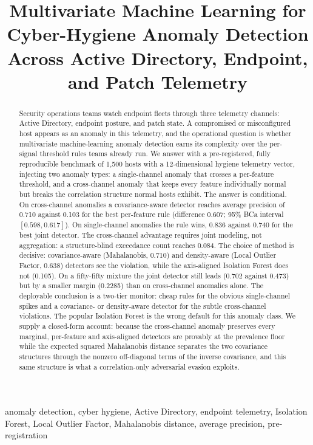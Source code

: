 \documentclass[journal]{IEEEtran}
\title{Multivariate Machine Learning for Cyber-Hygiene Anomaly Detection\\
Across Active Directory, Endpoint, and Patch Telemetry}
\author{%
  \IEEEauthorblockN{Harshavardhan Malla}
  \IEEEauthorblockA{Independent Researcher\\
  Email: harshavardhanmalla75@gmail.com}%
}
\begin{document}
\maketitle

\begin{abstract}
Security operations teams watch endpoint fleets through three telemetry channels: Active
Directory, endpoint posture, and patch state. A compromised or misconfigured host appears as an
anomaly in this telemetry, and the operational question is whether multivariate machine-learning
anomaly detection earns its complexity over the per-signal threshold rules teams already run. We
answer with a pre-registered, fully reproducible benchmark of 1{,}500 hosts with a
12-dimensional hygiene telemetry vector, injecting two anomaly types: a single-channel anomaly
that crosses a per-feature threshold, and a cross-channel anomaly that keeps every feature
individually normal but breaks the correlation structure normal hosts exhibit. The answer is
conditional. On cross-channel anomalies a covariance-aware detector reaches average precision of
0.710 against 0.103 for the best per-feature rule (difference 0.607; 95\% BCa interval
$[0.598, 0.617]$). On single-channel anomalies the rule wins, 0.836 against 0.740 for the best
joint detector. The cross-channel advantage requires joint modeling, not aggregation: a
structure-blind exceedance count reaches 0.084. The choice of method is decisive: covariance-aware
(Mahalanobis, 0.710) and density-aware (Local Outlier Factor, 0.638) detectors see the violation,
while the axis-aligned Isolation Forest does not (0.105). On a fifty-fifty mixture the joint
detector still leads (0.702 against 0.473) but by a smaller margin (0.2285) than on cross-channel
anomalies alone. The deployable conclusion is a two-tier monitor: cheap rules for the obvious
single-channel spikes and a covariance- or density-aware detector for the subtle cross-channel
violations. The popular Isolation Forest is the wrong default for this anomaly class. We supply a
closed-form account: because the cross-channel anomaly preserves every marginal, per-feature and
axis-aligned detectors are provably at the prevalence floor while the expected squared Mahalanobis
distance separates the two covariance structures through the nonzero off-diagonal terms of the
inverse covariance, and this same structure is what a correlation-only adversarial evasion exploits.
\end{abstract}

\begin{IEEEkeywords}
anomaly detection, cyber hygiene, Active Directory, endpoint telemetry, Isolation Forest,
Local Outlier Factor, Mahalanobis distance, average precision, pre-registration
\end{IEEEkeywords}
\end{document}
